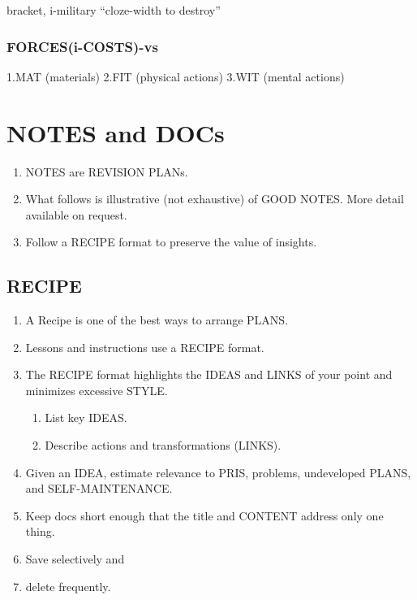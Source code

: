 \documentclass[
]{book}
\providecommand{\tightlist}{%
  \setlength{\itemsep}{0pt}\setlength{\parskip}{0pt}}
\begin{document}
bracket, i-military ``cloze-width to destroy''

\hypertarget{forcesi-costs-vs}{%
\subsubsection{FORCES(i-COSTS)-vs}\label{forcesi-costs-vs}}

1.MAT (materials)
2.FIT (physical actions)
3.WIT (mental actions)

\hypertarget{notes-and-docs}{%
\section{NOTES and DOCs}\label{notes-and-docs}}

\begin{enumerate}
\def\labelenumi{\arabic{enumi}.}
\setcounter{enumi}{34}
\item
  NOTES are REVISION PLANs.
\item
  What follows is illustrative (not exhaustive) of GOOD NOTES. More detail available on request.
\item
  Follow a RECIPE format to preserve the value of insights.
\end{enumerate}

\hypertarget{recipe}{%
\subsection{RECIPE}\label{recipe}}

\begin{enumerate}
\def\labelenumi{\arabic{enumi}.}
\setcounter{enumi}{34}
\tightlist
\item
  A Recipe is one of the best ways to arrange PLANS.
\item
  Lessons and instructions use a RECIPE format.
\item
  The RECIPE format highlights the IDEAS and LINKS of your point and minimizes excessive STYLE.

  \begin{enumerate}
  \def\labelenumii{\arabic{enumii}.}
  \tightlist
  \item
    List key IDEAS.
  \item
    Describe actions and transformations (LINKS).
  \end{enumerate}
\item
  Given an IDEA, estimate relevance to PRIS, problems, undeveloped PLANS, and SELF-MAINTENANCE.
\item
  Keep docs short enough that the title and CONTENT address only one
  thing.
\item
  Save selectively and
\item
  delete frequently.
\end{enumerate}
\end{document}
